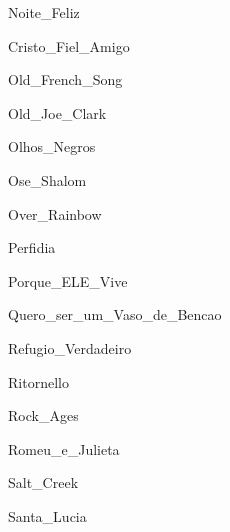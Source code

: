 \documentclass{scrartcl}
\begin{document}

{Noite_Feliz}


{Cristo_Fiel_Amigo}

    
{Old_French_Song}

 
{Old_Joe_Clark}


{Olhos_Negros}


{Ose_Shalom}


{Over_Rainbow}


{Perfidia}


{Porque_ELE_Vive}


{Quero_ser_um_Vaso_de_Bencao}


{Refugio_Verdadeiro}


{Ritornello}


{Rock_Ages}


{Romeu_e_Julieta}


{Salt_Creek}


{Santa_Lucia}
\end{document}
